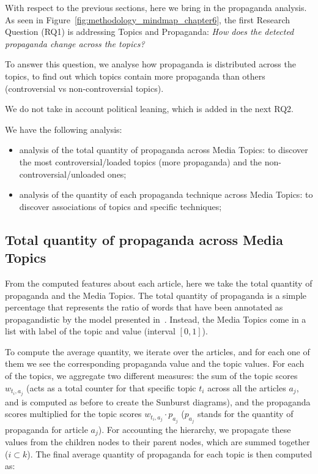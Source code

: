 With respect to the previous sections, here we bring in the propaganda analysis. As seen in Figure~\ref{fig:methodology_mindmap_chapter6}, the first Research Question (RQ1) is addressing Topics and Propaganda:
\emph{How does the detected propaganda change across the topics?}

To answer this question, we analyse how propaganda is distributed across the topics, to find out which topics contain more propaganda than others (controversial vs non-controversial topics).

We do not take in account political leaning, which is added in the next RQ2.

We have the following analysis:

\begin{itemize}
    \item analysis of the total quantity of propaganda across Media Topics: to discover the most controversial/loaded topics (more propaganda) and the non-controversial/unloaded ones;
    \item analysis of the quantity of each propaganda technique across Media Topics: to discover associations of topics and specific techniques;
\end{itemize}

\subsection{\statusgreen Total quantity of propaganda across Media Topics}
\label{sec:topic_propaganda_tot}

From the computed features about each article, here we take the total quantity of propaganda and the Media Topics.
The total quantity of propaganda is a simple percentage that represents the ratio of words that have been annotated as propagandistic by the model presented in~\citet{da2019fine}.
Instead, the Media Topics come in a list with label of the topic and value (interval $[0,1]$).

To compute the average quantity, we iterate over the articles, and for each one of them we see the corresponding propaganda value and the topic values. For each of the topics, we aggregate two different measures: the sum of the topic scores $w_{t_{i},a_{j}}$ (acts as a total counter for that specific topic $t_{i}$ across all the articles $a_{j}$, and is computed as before to create the Sunburst diagrams), and the propaganda scores multiplied for the topic scores $w_{t_{i},a_{j}} \cdot p_{a_{j}}$ ($p_{a_{j}}$ stands for the quantity of propaganda for article $a_{j}$).
For accounting the hierarchy, we propagate these values from the children nodes to their parent nodes, which are summed together ($i\subset k$).
The final average quantity of propaganda for each topic is then computed as:

